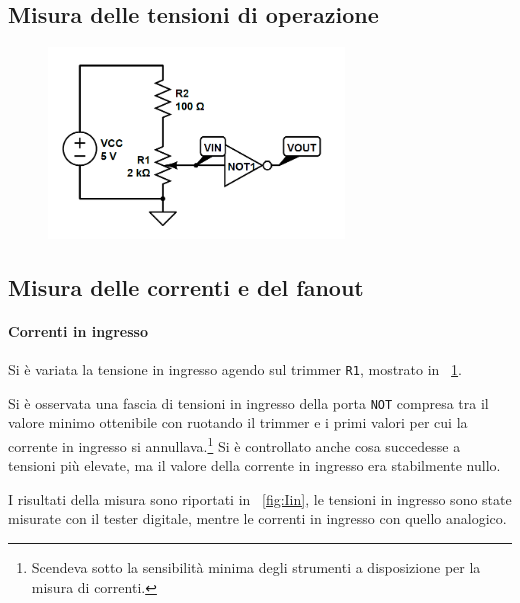 \documentclass[a4paper,10pt]{article}
\def\code#1{\texttt{#1}}
\begin{document}
\subsection{Misura delle tensioni di operazione}

\begin{figure}[H]
	\centering
	\includegraphics[width=0.7\textwidth]{../grafici/NOTin.png}
	\caption{}
	\label{fig:NOTin}
\end{figure}

\subsection{Misura delle correnti e del fanout}

\paragraph{Correnti in ingresso}

Si è variata la tensione in ingresso agendo sul trimmer \code{R1}, mostrato in \figurename{~\ref{fig:NOTin}}.
	
Si è osservata una fascia di tensioni in ingresso della porta \code{NOT} compresa tra il valore minimo ottenibile con ruotando il trimmer e i primi valori per cui la corrente in ingresso si annullava.\footnote{\label{nota:I0}Scendeva sotto la sensibilità minima degli strumenti a disposizione per la misura di correnti.} Si è controllato anche cosa succedesse a tensioni più elevate, ma il valore della corrente in ingresso era stabilmente nullo.

I risultati della misura sono riportati in \figurename{~\ref{fig:Iin}}, le tensioni in ingresso sono state misurate con il tester digitale, mentre le correnti in ingresso con quello analogico.
\end{document}
